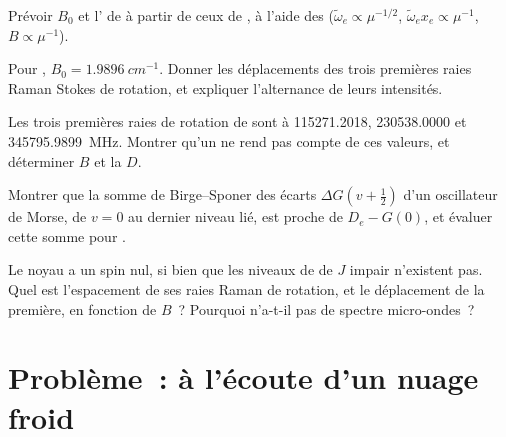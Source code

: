 \begin{exercise}[$\star\star$]\label{exo:b3:rovibrational-spectroscopy:8}
Prévoir $B_0$ et l' de  à partir de ceux
de , à l'aide des
 ($\tilde\omega_e \propto \mu^{-1/2}$, $\tilde\omega_ex_e \propto
\mu^{-1}$, $B \propto \mu^{-1}$).
\end{exercise}

\begin{exercise}[$\star\star$]\label{exo:b3:rovibrational-spectroscopy:9}
Pour , $B_0 = \qty{1.9896}{cm^{-1}}$. Donner les déplacements des
trois premières raies Raman Stokes de rotation, et expliquer
l'alternance de leurs intensités.
\end{exercise}

\begin{exercise}[$\star\star\star$]\label{exo:b3:rovibrational-spectroscopy:10}
Les trois premières raies de rotation de  sont à
115271.2018,
230538.0000 et \qty{345795.9899}{MHz}. Montrer qu'un  ne
rend pas compte de ces valeurs, et déterminer $B$ et la  $D$.
\end{exercise}

\begin{exercise}[$\star\star\star$]\label{exo:b3:rovibrational-spectroscopy:11}
Montrer que la somme de Birge--Sponer des écarts $\Delta G(v + \frac12)$
d'un oscillateur de Morse, de $v = 0$ au dernier niveau lié, est proche
de $D_e - G(0)$, et évaluer cette somme pour .
\end{exercise}

\begin{exercise}[$\star\star\star$]\label{exo:b3:rovibrational-spectroscopy:12}
Le noyau  a un spin nul, si bien que les niveaux de
 de
$J$ impair n'existent pas. Quel est l'espacement de ses raies Raman de
rotation, et le déplacement de la première, en fonction de $B$~?
Pourquoi  n'a-t-il pas de spectre micro-ondes~?
\end{exercise}

\section{Problème~: à l'écoute d'un nuage froid}

